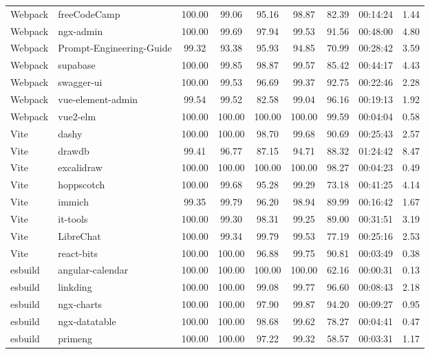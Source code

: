 \begin{longtable}{@{}l>{\raggedright\arraybackslash}p{25mm}ccccccc@{}}
Webpack & freeCodeCamp & 100.00 & 99.06 & 95.16 & 98.87 & 82.39 & 00:14:24 & 1.44 \\
Webpack & ngx-\allowbreak admin & 100.00 & 99.69 & 97.94 & 99.53 & 91.56 & 00:48:00 & 4.80 \\
Webpack & Prompt-\allowbreak Engineering-\allowbreak Guide & 99.32 & 93.38 & 95.93 & 94.85 & 70.99 & 00:28:42 & 3.59 \\
Webpack & supabase & 100.00 & 99.85 & 98.87 & 99.57 & 85.42 & 00:44:17 & 4.43 \\
Webpack & swagger-\allowbreak ui & 100.00 & 99.53 & 96.69 & 99.37 & 92.75 & 00:22:46 & 2.28 \\
Webpack & vue-\allowbreak element-\allowbreak admin & 99.54 & 99.52 & 82.58 & 99.04 & 96.16 & 00:19:13 & 1.92 \\
Webpack & vue2-\allowbreak elm & 100.00 & 100.00 & 100.00 & 100.00 & 99.59 & 00:04:04 & 0.58 \\
\midrule
Vite & dashy & 100.00 & 100.00 & 98.70 & 99.68 & 90.69 & 00:25:43 & 2.57 \\
Vite & drawdb & 99.41 & 96.77 & 87.15 & 94.71 & 88.32 & 01:24:42 & 8.47 \\
Vite & excalidraw & 100.00 & 100.00 & 100.00 & 100.00 & 98.27 & 00:04:23 & 0.49 \\
Vite & hoppscotch & 100.00 & 99.68 & 95.28 & 99.29 & 73.18 & 00:41:25 & 4.14 \\
Vite & immich & 99.35 & 99.79 & 96.20 & 98.94 & 89.99 & 00:16:42 & 1.67 \\
Vite & it-\allowbreak tools & 100.00 & 99.30 & 98.31 & 99.25 & 89.00 & 00:31:51 & 3.19 \\
Vite & LibreChat & 100.00 & 99.34 & 99.79 & 99.53 & 77.19 & 00:25:16 & 2.53 \\
Vite & react-\allowbreak bits & 100.00 & 100.00 & 96.88 & 99.75 & 90.81 & 00:03:49 & 0.38 \\
\midrule
esbuild & angular-\allowbreak calendar & 100.00 & 100.00 & 100.00 & 100.00 & 62.16 & 00:00:31 & 0.13 \\
esbuild & linkding & 100.00 & 100.00 & 99.08 & 99.77 & 96.60 & 00:08:43 & 2.18 \\
esbuild & ngx-\allowbreak charts & 100.00 & 100.00 & 97.90 & 99.87 & 94.20 & 00:09:27 & 0.95 \\
esbuild & ngx-\allowbreak datatable & 100.00 & 100.00 & 98.68 & 99.62 & 78.27 & 00:04:41 & 0.47 \\
esbuild & primeng & 100.00 & 100.00 & 97.22 & 99.32 & 58.57 & 00:03:31 & 1.17 \\

\end{longtable}

